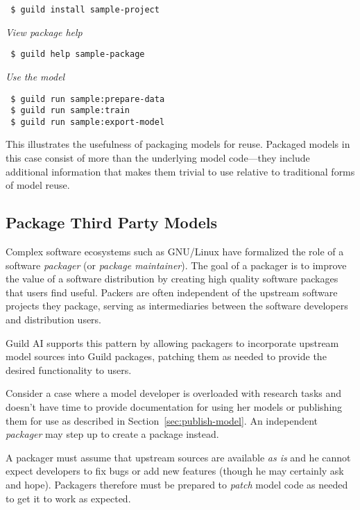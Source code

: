 \documentclass{article}
\begin{document}
{\footnotesize
\begin{verbatim}
 $ guild install sample-project
\end{verbatim}}

{\footnotesize\emph{View package help}}

{\footnotesize
\begin{verbatim}
 $ guild help sample-package
\end{verbatim}}

{\footnotesize\emph{Use the model}}

{\footnotesize
\begin{verbatim}
 $ guild run sample:prepare-data
 $ guild run sample:train
 $ guild run sample:export-model
\end{verbatim}}

\setlength{\parindent}{0em}

This illustrates the usefulness of packaging models for
reuse. Packaged models in this case consist of more than the
underlying model code---they include additional information that makes
them trivial to use relative to traditional forms of model reuse.

\subsection{Package Third Party Models}
\label{sec:package-maintainer}

Complex software ecosystems such as GNU/Linux have formalized the role
of a software \emph{packager} (or \emph{package maintainer}). The goal
of a packager is to improve the value of a software distribution by
creating high quality software packages that users find
useful. Packers are often independent of the upstream software
projects they package, serving as intermediaries between the software
developers and distribution users.

Guild AI supports this pattern by allowing packagers to incorporate
upstream model sources into Guild packages, patching them as needed to
provide the desired functionality to users.

Consider a case where a model developer is overloaded with research
tasks and doesn't have time to provide documentation for using her
models or publishing them for use as described in
Section~\ref{sec:publish-model}. An independent \emph{packager} may
step up to create a package instead.

A packager must assume that upstream sources are available \emph{as
  is} and he cannot expect developers to fix bugs or add new features
(though he may certainly ask and hope). Packagers therefore must be
prepared to \emph{patch} model code as needed to get it to work as
expected.
\end{document}
